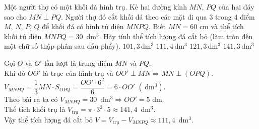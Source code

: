 \begin{ex}%
	Một người thợ có một khối đá hình trụ. Kẻ hai đường kính $MN$, $PQ$ của hai đáy sao cho $MN\perp PQ$. Người thợ đó cắt khối đá theo các mặt đi qua $3$ trong $4$ điểm $M$, $N$, $P$, $Q$ để khối đá có hình tứ diện $MNPQ$. Biết $MN=60$ cm và thể tích khối tứ diện $MNPQ=30$ $\mathrm{\,d}{\text{m}^3}$. Hãy tính thể tích lượng đá cắt bỏ (làm tròn đến một chữ số thập phân sau dấu phẩy).
	\choice
	{$101,3\mathrm{\,d}{\text{m}^3}$}
	{\True $111,4\mathrm{\,d}{\text{m}^3}$}
	{$121,3\mathrm{\,d}{\text{m}^3}$}
	{$141,3\mathrm{\,d}{\text{m}^3}$}
	\loigiai
	{\begin{center}
		\end{center}
		Gọi $O$ và $O'$ lần lượt là trung điểm $MN$ và $PQ$.\\
		Khi đó $OO'$ là trục của hình trụ và $O{O}'\perp MN\Rightarrow MN\perp\left(OPQ\right)$.\\
		$V_{MNPQ}=\dfrac{1}{3}MN\cdot S_{OPQ}=\dfrac{O{O}'\cdot {6^2}}{6}=6\cdot O{O}'$ $\left(\mathrm{\,d}{\text{m}^{\text{3}}}\right)$.\\
		Theo bài ra ta có $V_{MNPQ}=30$ $\mathrm{\,d}{\text{m}^3}\Rightarrow O{O}'=5$ $\text{dm}$.\\
		Thể tích khối trụ là $V_\text{trụ}=\pi\cdot {3^2}\cdot 5\approx 141,4$ $\mathrm{\,d}{\text{m}^3}$.\\
		Vậy thể tích lượng đá cắt bỏ $V=V_\text{trụ}-V_{MNPQ}\approx 111,4$ $\mathrm{\,d}{\text{m}^3}$.}
\end{ex}

